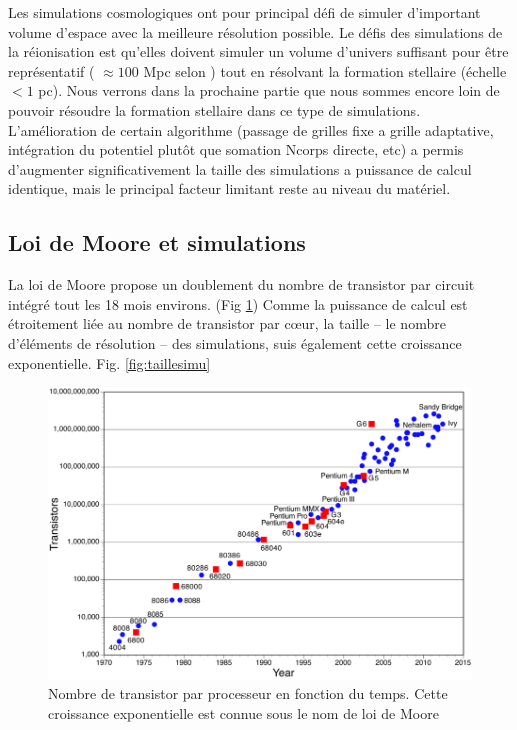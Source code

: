 Les simulations cosmologiques ont pour principal défi de simuler d'important volume d'espace avec la meilleure résolution possible.
Le défis des simulations de la réionisation est qu'elles doivent simuler un volume d'univers suffisant pour être représentatif ( $\approx 100$ Mpc selon \cite{iliev_cosmological_2006}) tout en résolvant la formation stellaire (échelle $<1$ pc).
Nous verrons dans la prochaine partie que nous sommes encore loin de pouvoir résoudre la formation stellaire dans ce type de simulations. %
L’amélioration de certain algorithme (passage de grilles fixe a grille adaptative, intégration du potentiel plutôt que somation Ncorps directe, etc) a permis d'augmenter significativement la taille des simulations a puissance de calcul identique, mais le principal facteur limitant reste au niveau du matériel.

\subsection{Loi de Moore et simulations}
La loi de Moore \citep{moore1965cramming} propose un doublement du nombre de transistor par circuit intégré tout les 18 mois environs. (Fig \ref{fig:moore})
Comme la puissance de calcul est étroitement liée au nombre de transistor par cœur, la taille -- le nombre d'éléments de résolution -- des simulations, suis également cette croissance exponentielle.
Fig. \ref{fig:taillesimu}

\begin{figure}[bth]
        \includegraphics[width=.95\linewidth]{img/02/moorelaw.png} 
        \caption{Nombre de transistor par processeur en fonction du temps.
        Cette croissance exponentielle est connue sous le nom de loi de Moore}
 		\label{fig:moore}
\end{figure}

